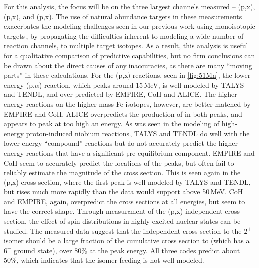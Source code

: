 For this analysis, the focus will be on the three largest channels  measured -- (p,x), (p,x), and (p,x).
The use of natural abundance targets in these measurements exacerbates the modeling  challenges seen in our previous work using monoisotopic targets\,\cite{Voyles2018a}, by propagating the difficulties inherent to modeling a wide number of reaction channels, to multiple target isotopes.
As a result, this analysis is useful for a qualitative comparison of predictive capabilities, but no firm conclusions can be drawn about the direct causes of any inaccuracies, as there are many \enquote{moving parts} in these calculations.
For the (p,x) reactions, seen in \autoref{fig:51Mn}, the lower-energy  (p,$\alpha$) reaction, which peaks around 15\,MeV, is  well-modeled by TALYS and TENDL, and over-predicted by EMPIRE, CoH and ALICE.
The higher-energy reactions on the higher mass Fe isotopes, however, are better matched by  EMPIRE and CoH.
ALICE overpredicts the production of  in both peaks, and appears to peak at too high an energy.
As was seen in the modeling of high-energy proton-induced niobium reactions\,\cite{Voyles2018a}, TALYS and TENDL do well with the lower-energy \enquote{compound} reactions but do not accurately predict the higher-energy reactions that have a significant pre-equilibrium component.
EMPIRE and CoH seem to accurately predict the locations of the peaks, but often fail to reliably estimate the magnitude of the cross section.
This is seen again in the  (p,x) cross section, where the first peak is well-modeled by TALYS and TENDL, but  rises much more rapidly than the data would support above 50\,MeV.
CoH and EMPIRE, again, overpredict the cross sections at all energies, but seem to have the correct shape.
Through measurement of the  (p,x) independent cross section, the effect of spin distributions in highly-excited nuclear states can be studied.
The measured data suggest that the independent cross section to the $2^+$ isomer should be a large fraction of the cumulative cross section to  (which has a $6^+$ ground state), over 80\% at the peak energy.
All three codes predict about 50\%, which indicates that the isomer feeding is not well-modeled.

